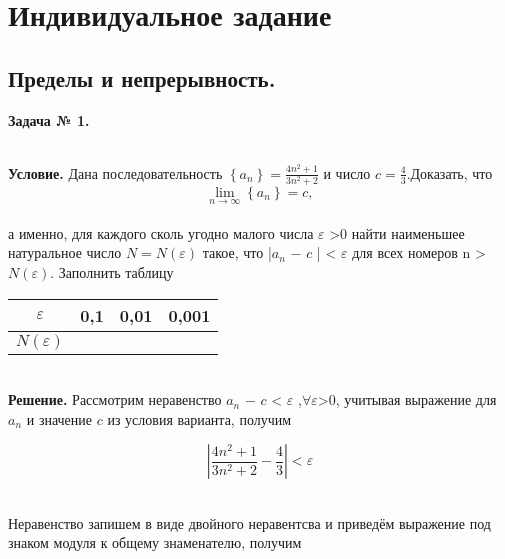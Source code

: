 \documentclass[a4paper,12pt]{article} %
\begin{document}
\newpage
\section{Индивидуальное задание}
%

\subsection{Пределы и непрерывность.}
\begin{center}

\textbf{Задача № 1.}
\end{center}\\
\textbf{Условие.} Дана последовательность $\left\lbrace a_n \right\rbrace=\frac{4n^2+1}{3n^2+2}$ и число $c=\frac{4}{3}$.Доказать, что \[ \lim \limits_{n \to \infty} \left\lbrace {a_n} \right\rbrace =c,\]\\
а именно, для каждого сколь угодно малого числа $\varepsilon$ >0 найти наименьшее натуральное
число $N = N(\varepsilon )$ такое, что |$ a_n $ $-$ $c$ | < $\varepsilon$ для всех номеров n > $N(\varepsilon)$. Заполнить таблицу\\
\begin{center}

\begin{tabular}{|c|c|c|c|}
\hline 
$\varepsilon$ & 0,1 & 0,01 & 0,001 \\ 
\hline 
$N(\varepsilon)$ & {} & {} & {} \\ 
\hline 
\end{tabular} 
\end{center}\\
\textbf {Решение.} Рассмотрим неравенство $ a_n $ $-$ $c$ < $\varepsilon$ ,$\forall \varepsilon$>0, учитывая выражение для $ a_n $ и значение $c$ из условия варианта, получим\\
\begin{center}
\[\left|\frac{4n^2+1}{3n^2+2}-\frac{4}{3}\right|<\varepsilon\]
\end{center}\\
Неравенство запишем в виде двойного неравентсва и приведём выражение под знаком модуля к общему знаменателю, получим\\
\end{document}
